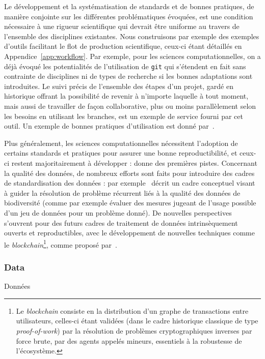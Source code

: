 Le développement et la systématisation de standards et de bonnes pratiques, de manière conjointe sur les différentes problématiques évoquées, est une condition nécessaire à une rigueur scientifique qui devrait être uniforme au travers de l'ensemble des disciplines existantes. Nous construisons par exemple des exemples d'outils facilitant le flot de production scientifique, ceux-ci étant détaillés en Appendice~\ref{app:workflow}. Par exemple, pour les sciences computationnelles, on a déjà évoqué les potentialités de l'utilisation de \texttt{git} qui s'étendent en fait sans contrainte de disciplines ni de types de recherche si les bonnes adaptations sont introduites. Le suivi précis de l'ensemble des étapes d'un projet, gardé en historique offrant la possibilité de revenir à n'importe laquelle à tout moment, mais aussi de travailler de façon collaborative, plus ou moins parallèlement selon les besoins en utilisant les branches, est un exemple de service fourni par cet outil. Un exemple de bonnes pratiques d'utilisation est donné par~\cite{10.1371/journal.pcbi.1004947}.


Plus généralement, les sciences computationnelles nécessitent l'adoption de certains standards et pratiques pour assurer une bonne reproductibilité, et ceux-ci restent majoritairement à développer : \cite{wilson2017good} donne des premières pistes. Concernant la qualité des données, de nombreux efforts sont faits pour introduire des cadres de standardisation des données : par exemple~\cite{10.1371/journal.pone.0178731} décrit un cadre conceptuel visant à guider la résolution de problème récurrent liés à la qualité des données de biodiversité (comme par exemple évaluer des mesures jugeant de l'usage possible d'un jeu de données pour un problème donné). De nouvelles perspectives s'ouvrent pour des futurs cadres de traitement de données intrinsèquement ouverts et reproductibles, avec le développement de nouvelles techniques comme le \emph{blockchain}\footnote{Le \emph{blockchain} consiste en la distribution d'un graphe de transactions entre utilisateurs, celles-ci étant validées (dans le cadre historique classique de type \emph{proof-of-work}) par la résolution de problèmes cryptographiques inverses par force brute, par des agents appelés mineurs, essentiels à la robustesse de l'écosystème.}, comme proposé par~\cite{2017arXiv170706552}.


\subsubsection{Data}{Données}

